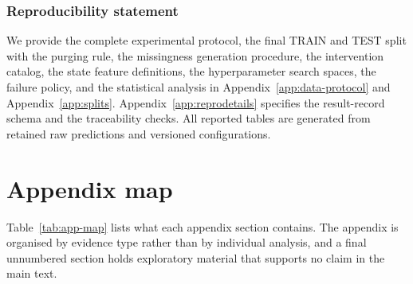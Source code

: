 \documentclass{article}
\newcommand{\ph}[1]{\textcolor{phgray}{\textsf{[\detokenize{#1}]}}}
\begin{document}
\subsubsection*{Reproducibility statement}
We provide the complete experimental protocol, the final TRAIN and TEST split with the
purging rule, the missingness generation procedure, the intervention catalog, the state
feature definitions, the hyperparameter search spaces, the failure policy, and the statistical
analysis in Appendix~\ref{app:data-protocol} and Appendix~\ref{app:splits}.
Appendix~\ref{app:reprodetails} specifies the result-record schema and the traceability checks.
All reported tables are generated from retained raw predictions and versioned configurations.







\appendix

\newpage



\section*{Appendix map}
\label{app:map}
Table~\ref{tab:app-map} lists what each appendix section contains. The appendix is organised
by evidence type rather than by individual analysis, and a final unnumbered section holds
exploratory material that supports no claim in the main text.
\end{document}

